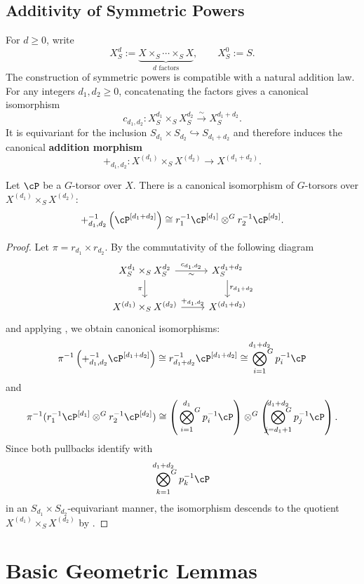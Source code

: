 %
%
\subsection*{Additivity of Symmetric Powers}
For $d\geq 0$, write
\[
X_S^d:=\underbrace{X\times_S\cdots\times_S X}_{d\text{ factors}},
\qquad X_S^0:=S.
\]
The construction of symmetric powers is compatible with a natural addition
law. For any integers $d_1,d_2\geq 0$, concatenating the factors gives a
canonical isomorphism
\[
c_{d_1,d_2}:X_S^{d_1}\times_S X_S^{d_2}
\xrightarrow{\sim}X_S^{d_1+d_2}.
\]
It is equivariant for the inclusion
$S_{d_1}\times S_{d_2}\hookrightarrow S_{d_1+d_2}$ and therefore induces
the canonical \textbf{addition morphism}
\[
+_{d_1,d_2}:X^{(d_1)}\times_S X^{(d_2)}
\longrightarrow X^{(d_1+d_2)}.
\]

\begin{prop}\label{prop:symmetric_powers_on_curves}
    Let $\cP$ be a $G$-torsor over $X$. There is a canonical isomorphism of $G$-torsors over $X^{(d_1)} \times_S X^{(d_2)}$:
    \[
    +_{d_1, d_2}^{-1} \left( \cP^{[d_1+d_2]} \right) \cong r_1^{-1} \cP^{[d_1]} \otimes^G r_2^{-1} \cP^{[d_2]}.
    \]
\end{prop}
\begin{proof}
Let $\pi = r_{d_1} \times r_{d_2}$. By the commutativity of the following diagram
\[
\begin{tikzcd}
X_S^{d_1}\times_S X_S^{d_2} \arrow[r, "c_{d_1,d_2}", "\sim"'] \arrow[d, "\pi"'] & X_S^{d_1+d_2} \arrow[d, "r_{d_1+d_2}"] \\
X^{(d_1)} \times_S X^{(d_2)} \arrow[r, "+_{d_1, d_2}"] & X^{(d_1+d_2)}
\end{tikzcd}
\]
and applying , we obtain canonical isomorphisms:
\[
\pi^{-1} \left( +_{d_1, d_2}^{-1} \cP^{[d_1+d_2]} \right) \cong r_{d_1+d_2}^{-1} \cP^{[d_1+d_2]} \cong \sideset{}{^G}\bigotimes_{i=1}^{d_1+d_2} p_i^{-1} \cP
\]
and
\[
\pi^{-1} (r_1^{-1} \cP^{[d_1]} \otimes^G r_2^{-1} \cP^{[d_2]}) \cong \left( \sideset{}{^G}\bigotimes_{i=1}^{d_1} p_i^{-1} \cP \right) \otimes^G \left( \sideset{}{^G}\bigotimes_{j=d_1+1}^{d_1+d_2} p_j^{-1} \cP \right).
\]
Since both pullbacks identify with
\[
\sideset{}{^G}\bigotimes_{k=1}^{d_1+d_2} p_k^{-1} \cP
\]
in an $S_{d_1} \times S_{d_2}$-equivariant manner, the isomorphism descends to the quotient $X^{(d_1)} \times_S X^{(d_2)}$ by .
\end{proof}

\section{Basic Geometric Lemmas}

